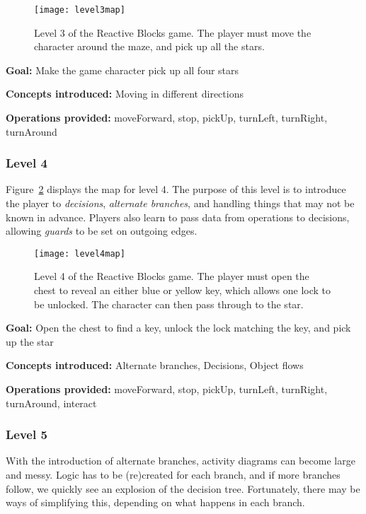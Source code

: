 \begin{figure}[htp]
	\centering
	\texttt{[image: level3map]}
	\caption[Level 3 of the Reactive Blocks game]{Level 3 of the Reactive Blocks game. The player must move the character around the maze, and pick up all the stars.}
	\label{fig:level3map}
\end{figure}

\noindent
\textbf{Goal:} Make the game character pick up all four stars

\noindent
\textbf{Concepts introduced:} Moving in different directions

\noindent
\textbf{Operations provided:} moveForward, stop, pickUp, turnLeft, turnRight, turnAround

\subsubsection{Level 4}
Figure~\ref{fig:level4map} displays the map for level 4. The purpose of this level is to introduce the player to \emph{decisions}, \emph{alternate branches}, and handling things that may not be known in advance. Players also learn to pass data from operations to decisions, allowing \emph{guards} to be set on outgoing edges.

\begin{figure}[htp]
	\centering
	\texttt{[image: level4map]}
	\caption[Level 4 of the Reactive Blocks game]{Level 4 of the Reactive Blocks game. The player must open the chest to reveal an either blue or yellow key, which allows one lock to be unlocked. The character can then pass through to the star.}
	\label{fig:level4map}
\end{figure}

\noindent
\textbf{Goal:} Open the chest to find a key, unlock the lock matching the key, and pick up the star

\noindent
\textbf{Concepts introduced:} Alternate branches, Decisions, Object flows

\noindent
\textbf{Operations provided:} moveForward, stop, pickUp, turnLeft, turnRight, turnAround, interact

\subsubsection{Level 5}
With the introduction of alternate branches, activity diagrams can become large and messy. Logic has to be (re)created for each branch, and if more branches follow, we quickly see an explosion of the decision tree. Fortunately, there may be ways of simplifying this, depending on what happens in each branch.


